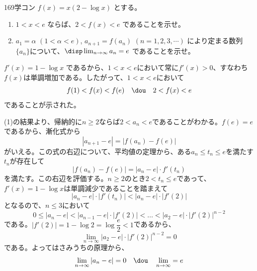 \begin{prob}{169}{}{学コン}
 $f(x)=x(2-\log x)$ とする。
 \begin{enumerate}
  \item $1<x<e$ ならば、$2<f(x)<e$ であることを示せ。
  \item $a_1=\alpha$ $(1<\alpha <e)$, $a_{n+1}=f(a_n)$ $(n=1, 2, 3, \cdots)$ により定まる数列$\{a_n\}$について、$\disp \lim_{n\to\infty} a_n = e$ であることを示せ。
 \end{enumerate}
\end{prob}

$f'(x)=1-\log x$ であるから、$1<x<e$において常に$f'(x)>0$、すなわち$f(x)$は単調増加である。したがって、$1<x<e$において
\[ f(1)<f(x)<f(e) \quad\dou\quad 2<f(x)<e \]
であることが示された。

(1)の結果より、帰納的に$n\ge 2$ならば$2<a_n<e$であることがわかる。$f(e)=e$であるから、漸化式から
\[ |a_{n+1}-e|=|f(a_n)-f(e)| \]
がいえる。この式の右辺について、平均値の定理から、ある$a_n\le t_n \le e$を満たす$t_n$が存在して
\[ |f(a_n)-f(e)|=|a_n-e|\cdot f'(t_n) \]
を満たす。この右辺を評価する。$n\ge 2$のとき$2<t_n\le e$であって、$f'(x)=1-\log x$は単調減少であることを踏まえて
\[ |a_n-e|\cdot |f'(t_n)| < |a_n-e|\cdot |f'(2)| \]
となるので、$n\le 3$において
\[ 0\le |a_n-e|<|a_{n-1}-e|\cdot |f'(2)|<\dots< |a_2-e|\cdot |f'(2)|^{n-2} \]
である。$|f'(2)|=1-\log 2=\log \dfrac{e}{2}<1$であるから、
\[ \lim_{n\to\infty} |a_2-e|\cdot |f'(2)|^{n-2}=0 \]
である。よってはさみうちの原理から、
\[ \lim_{n\to\infty} |a_n-e|=0 \quad\dou\quad \lim_{n\to\infty} =e \]